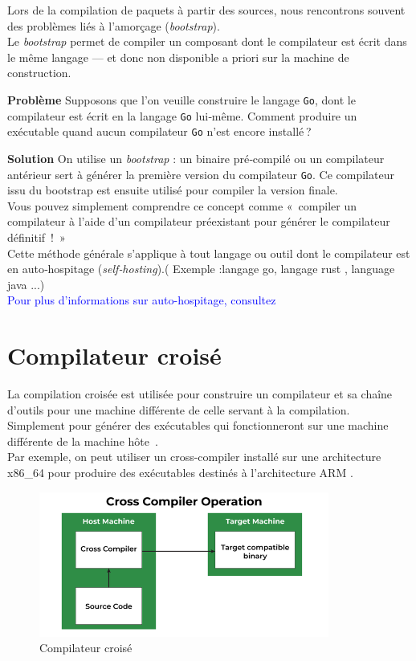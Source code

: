 Lors de la compilation de paquets à partir des sources, nous rencontrons souvent des problèmes liés à l’amorçage (\emph{bootstrap}).  \\
Le \emph{bootstrap}  permet de compiler un composant dont le compilateur est écrit dans le même langage — et donc non disponible a priori sur la machine de construction. 

\bigskip
\noindent
\textbf{Problème}  
Supposons que l’on veuille construire le langage \texttt{Go}, dont le compilateur  est écrit en la langage  \texttt{Go} lui‑même. Comment produire un exécutable quand aucun compilateur \texttt{Go} n’est encore installé ?

\medskip
\noindent
\textbf{Solution}  
On utilise un \emph{bootstrap} : un binaire pré‑compilé ou un compilateur antérieur sert à générer la première version du compilateur \texttt{Go}. Ce compilateur issu du bootstrap est ensuite utilisé pour compiler la version finale.  \\
Vous pouvez simplement comprendre ce concept comme « compiler un compilateur à l’aide d’un compilateur préexistant pour générer le compilateur définitif ! »\\



Cette méthode générale s’applique à tout langage ou outil dont le compilateur est en auto‑hospitage (\emph{self‑hosting}).( Exemple :langage go,  langage rust , language java ...) \\
\textcolor{blue}{Pour plus d’informations sur auto-hospitage, consultez \cite{bootstrap}}
\section{Compilateur croisé}
\label{subsec:cross-compiler}

La compilation croisée est utilisée pour construire un compilateur et sa chaîne d’outils pour une machine différente de celle servant à la compilation. \\ 
Simplement pour générer des exécutables qui fonctionneront sur une machine différente de la machine hôte .\\ 
Par exemple, on peut utiliser un cross-compiler installé sur une architecture x86\_64 pour produire des exécutables destinés à l’architecture ARM .

\begin{figure}[!htbp]
  \centering
  \includegraphics[width=0.85\textwidth]{images_pfe/crosscompiler.png}
  \caption{Compilateur croisé}
  \label{fig:crosscompiler}
\end{figure}

